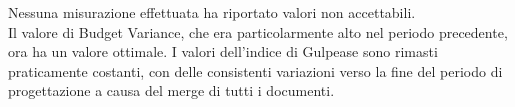 Nessuna misurazione effettuata ha riportato valori non accettabili.\\
Il valore di Budget Variance, che era particolarmente alto nel periodo precedente, ora ha un valore ottimale.
I valori dell'indice di Gulpease sono rimasti praticamente costanti, con delle consistenti variazioni verso la fine del periodo di progettazione a causa del merge di tutti i documenti.